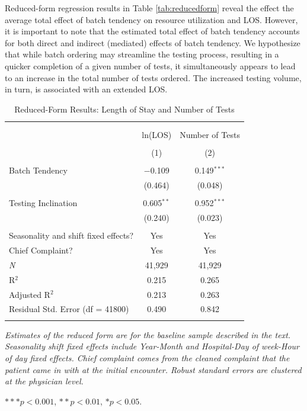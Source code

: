 \documentclass[,,nonblindrev]{informs}
\begin{document}
Reduced-form regression results in Table \ref{tab:reducedform} reveal
the effect the average total effect of batch tendency on resource
utilization and LOS. However, it is important to note that the estimated
total effect of batch tendency accounts for both direct and indirect
(mediated) effects of batch tendency. We hypothesize that while batch
ordering may streamline the testing process, resulting in a quicker
completion of a given number of tests, it simultaneously appears to lead
to an increase in the total number of tests ordered. The increased
testing volume, in turn, is associated with an extended LOS.

\begin{table}[!htbp] \centering 
\caption{Reduced-Form Results: Length of Stay and Number of Tests}
  \label{} 
\begin{tabular}{@{\extracolsep{5pt}}lcc} 
\\[-1.8ex]\hline 
\hline \\[-1.8ex] 
\\[-1.8ex] & ln(LOS) & Number of Tests \\ 
\\[-1.8ex] & (1) & (2)\\ 
\hline \\[-1.8ex] 
 Batch Tendency & $-$0.109 & 0.149$^{***}$ \\ 
  & (0.464) & (0.048) \\ 
  & & \\ 
 Testing Inclination & 0.605$^{**}$ & 0.952$^{***}$ \\ 
  & (0.240) & (0.023) \\ 
  & & \\ 
Seasonality and shift fixed effects? & Yes & Yes \\
Chief Complaint? & Yes & Yes  \\
\hline 
\textit{N} & 41,929 & 41,929 \\ 
R$^{2}$ & 0.215 & 0.265 \\ 
Adjusted R$^{2}$ & 0.213 & 0.263 \\ 
Residual Std. Error (df = 41800) & 0.490 & 0.842 \\ 
\hline 
\hline \\[-1.8ex] 
\end{tabular} 
\begin{tablenotes}
\small
\item \textit{Estimates of the reduced form are for the baseline sample described in the text. Seasonality shift fixed effects include Year-Month and Hospital-Day of week-Hour of day fixed effects. Chief complaint comes from the cleaned complaint that the patient came in with at the initial encounter. Robust standard errors are clustered at the physician level.}
\item $*** p < 0.001$, $** p < 0.01$, $* p < 0.05$.
\end{tablenotes}
\end{table}
\end{document}

